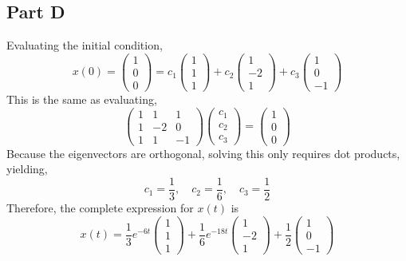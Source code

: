 \documentclass{article}
\begin{document}
\subsection*{Part D}

Evaluating the initial condition,
$$ x(0) = \begin{pmatrix}
  1 \\
  0 \\
  0
\end{pmatrix} = c_1 \begin{pmatrix}
  1 \\
  1 \\
  1
\end{pmatrix} + c_2 \begin{pmatrix}
  1 \\
  -2 \\
  1
\end{pmatrix} + c_3 \begin{pmatrix}
  1 \\
  0 \\
  -1
\end{pmatrix} $$
This is the same as evaluating,
$$ \begin{pmatrix}
  1 & 1 & 1 \\
  1 & -2 & 0 \\
  1 & 1 & -1
\end{pmatrix} \begin{pmatrix}
  c_1 \\
  c_2 \\
  c_3
\end{pmatrix} = \begin{pmatrix}
  1 \\
  0 \\
  0
\end{pmatrix} $$
Because the eigenvectors are orthogonal, solving this only requires dot
products, yielding,
$$ c_1 = \frac{1}{3},\quad c_2 = \frac{1}{6},\quad c_3 = \frac{1}{2} $$
Therefore, the complete expression for $x(t)$ is
$$ x(t) = \frac{1}{3} e^{-6t} \begin{pmatrix}
  1 \\
  1 \\
  1
\end{pmatrix} + \frac{1}{6} e^{-18t} \begin{pmatrix}
  1 \\
  -2 \\
  1
\end{pmatrix} + \frac{1}{2} \begin{pmatrix}
  1 \\
  0 \\
  -1
\end{pmatrix} $$
\end{document}
